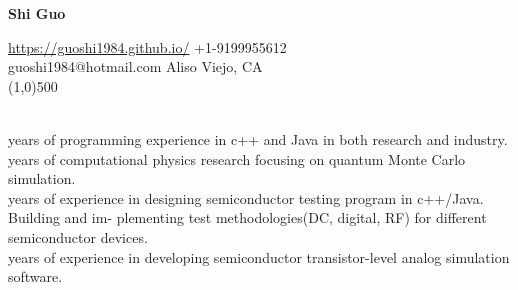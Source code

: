 \documentclass[11pt]{article} %
\begin{document}
 \centerline{\Large \bf Shi Guo}
  \noindent \url{https://guoshi1984.github.io/} \hspace{80mm}  +1-9199955612\\
    guoshi1984@hotmail.com \hspace{95mm}   Aliso Viejo, CA\\
\line(1,0){500}


\vspace{2mm}

\\
 years of programming experience in c++ and Java in both research and industry.  \\
 years of computational physics research focusing on quantum Monte Carlo simulation. \\
 years of experience in designing semiconductor testing program in c++/Java. Building and im-
plementing test methodologies(DC, digital, RF) for different semiconductor devices.\\
 years of experience in developing semiconductor transistor-level analog simulation software.\\

\vspace{-2mm}


\vspace{0mm}
\end{document}
